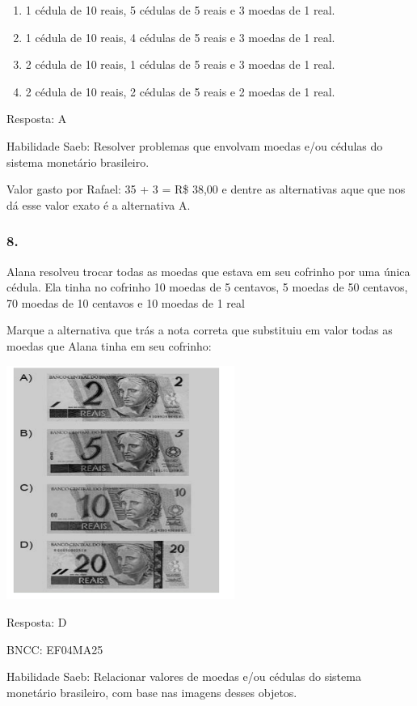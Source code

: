 \begin{enumerate}
\def\labelenumi{\alph{enumi})}
\item
  1 cédula de 10 reais, 5 cédulas de 5 reais e 3 moedas de 1 real.
\item
  1 cédula de 10 reais, 4 cédulas de 5 reais e 3 moedas de 1 real.
\item
  2 cédula de 10 reais, 1 cédulas de 5 reais e 3 moedas de 1 real.
\item
  2 cédula de 10 reais, 2 cédulas de 5 reais e 2 moedas de 1 real.
\end{enumerate}

Resposta: A

Habilidade Saeb: Resolver problemas que envolvam moedas e/ou cédulas do
sistema monetário brasileiro.

Valor gasto por Rafael: 35 + 3 = R\$ 38,00 e dentre as alternativas aque
que nos dá esse valor exato é a alternativa A.

\subsubsection{8.}\label{section-194}

Alana resolveu trocar todas as moedas que estava em seu cofrinho por uma
única cédula. Ela tinha no cofrinho 10 moedas de 5 centavos, 5 moedas de
50 centavos, 70 moedas de 10 centavos e 10 moedas de 1 real

Marque a alternativa que trás a nota correta que substituiu em valor
todas as moedas que Alana tinha em seu cofrinho:

\includegraphics[width=2.93590in,height=3.00930in]{media/image168.png}

Resposta: D

BNCC: EF04MA25

Habilidade Saeb: Relacionar valores de moedas e/ou cédulas do sistema
monetário brasileiro, com base nas imagens desses objetos.

